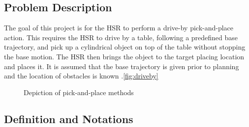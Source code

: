 \documentclass[12pt]{article}
\begin{document}
    \subsection{Problem Description}
        The goal of this project is for the HSR to perform a drive-by pick-and-place action. This requires the HSR to drive by a table, following a predefined base trajectory, and pick up a cylindrical object on top of the table without stopping the base motion. The HSR then brings the object to the target placing location and places it. It is assumed that the base trajectory is given prior to planning and the location of obstacles is known .\cref{fig:driveby}
        \begin{figure}[ht]
            \centering
            \quad
            \caption{Depiction of pick-and-place methods}
            \label{fig:driveby_methods}
        \end{figure}

    
    \subsection{Definition and Notations}

\end{document}
